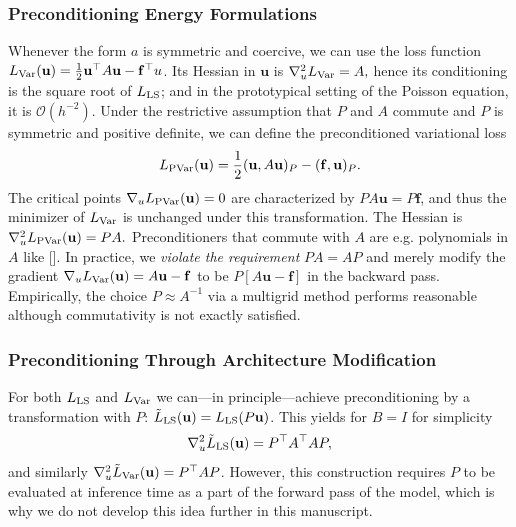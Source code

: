 \documentclass{article} %
\begin{document}
\subsubsection{Preconditioning Energy Formulations}
Whenever the form $a$ is symmetric and coercive, we can use the loss function $L_{\textup{Var}}(\mathbf u) = \tfrac12\mathbf u^\top A \mathbf u - \mathbf f^\top u$. Its Hessian in $\mathbf u$ is
$
   \nabla^2_u L_{\textup{Var}} = A,
$
hence its conditioning is the square root of $L_\textup{LS}$; and in the prototypical setting of the Poisson equation, it is $\mathcal O(h^{-2})$. Under the restrictive assumption that $P$ and $A$ commute and $P$ is symmetric and positive definite, we can define the preconditioned variational loss
\begin{equation*}
   L_{\textup{PVar}}(\mathbf u) = \frac12 (\mathbf u, A \mathbf u)_P - (\mathbf f, \mathbf u)_P.
\end{equation*}
The critical points $\nabla_u L_{\textup{PVar}}(\mathbf u) = 0$ are characterized by $PA\mathbf u = P\mathbf f$, and thus the minimizer of $L_\textup{Var}$ is unchanged under this transformation. The Hessian is
$
   \nabla^2_u L_{\textup{PVar}}(\mathbf u) = PA.
$
Preconditioners that commute with $A$ are e.g. polynomials in $A$ like []. In practice, we \emph{violate the requirement} $PA=AP$ and merely modify the gradient $\nabla_u L_\textup{Var}(\mathbf u) = A\mathbf u - \mathbf f$ to be $P[A\mathbf u - \mathbf f]$ in the backward pass. Empirically, the choice $P\approx A^{-1}$ via a multigrid method performs reasonable although commutativity is not exactly satisfied.

\subsubsection{Preconditioning Through Architecture Modification}
For both $L_{\textup{LS}}$ and $L_{\textup{Var}}$ we can---in principle---achieve preconditioning by a transformation with $P$: $\tilde L_\textup{LS}(\mathbf u) = L_\textup{LS}(P\mathbf u)$. This yields for $B=I$ for simplicity
\begin{equation*}
   \nabla_u^2 \tilde L_{\textup{LS}}(\mathbf u) = P^\top A^\top A P,
\end{equation*}
and similarly $\nabla_u^2 \tilde L_{\textup{Var}}(\mathbf u) = P^\top A P$. However, this construction requires $P$ to be evaluated at inference time as a part of the forward pass of the model, which is why we do not develop this idea further in this manuscript.
\end{document}
